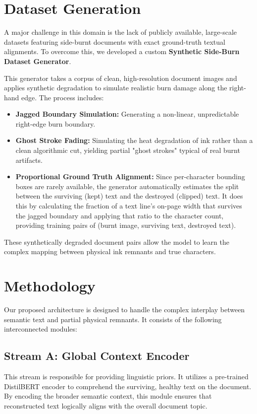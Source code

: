 \documentclass{article}
\begin{document}
\section{Dataset Generation}
A major challenge in this domain is the lack of publicly available, large-scale datasets featuring side-burnt documents with exact ground-truth textual alignments. To overcome this, we developed a custom \textbf{Synthetic Side-Burn Dataset Generator}. 

This generator takes a corpus of clean, high-resolution document images and applies synthetic degradation to simulate realistic burn damage along the right-hand edge. The process includes:
\begin{itemize}
    \item \textbf{Jagged Boundary Simulation:} Generating a non-linear, unpredictable right-edge burn boundary.
    \item \textbf{Ghost Stroke Fading:} Simulating the heat degradation of ink rather than a clean algorithmic cut, yielding partial "ghost strokes" typical of real burnt artifacts.
    \item \textbf{Proportional Ground Truth Alignment:} Since per-character bounding boxes are rarely available, the generator automatically estimates the split between the surviving (kept) text and the destroyed (clipped) text. It does this by calculating the fraction of a text line's on-page width that survives the jagged boundary and applying that ratio to the character count, providing training pairs of (burnt image, surviving text, destroyed text).
\end{itemize}
These synthetically degraded document pairs allow the model to learn the complex mapping between physical ink remnants and true characters.

\section{Methodology}
Our proposed architecture is designed to handle the complex interplay between semantic text and partial physical remnants. It consists of the following interconnected modules:

\subsection{Stream A: Global Context Encoder}
This stream is responsible for providing linguistic priors. It utilizes a pre-trained DistilBERT encoder to comprehend the surviving, healthy text on the document. By encoding the broader semantic context, this module ensures that reconstructed text logically aligns with the overall document topic.
\end{document}
